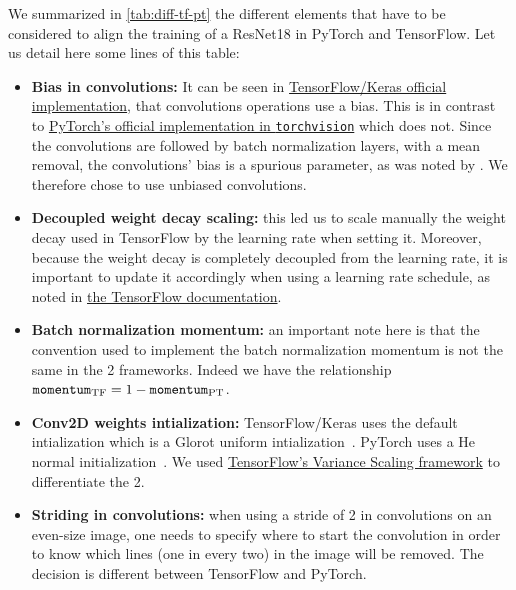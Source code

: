 \documentclass{article}
\begin{document}
We summarized in \autoref{tab:diff-tf-pt} the different elements that have to be considered to align the training of a ResNet18 in PyTorch and TensorFlow.
Let us detail here some lines of this table:
\begin{itemize}[topsep=0pt,itemsep=1ex,partopsep=0ex,parsep=0ex,leftmargin=3ex]
    \item \textbf{Bias in convolutions:} It can be seen in \href{https://github.com/keras-team/keras/blob/master/keras/applications/resnet.py#L238}{TensorFlow/Keras official implementation}, that convolutions operations use a bias. This is in contrast to \href{https://github.com/pytorch/vision/blob/main/torchvision/models/resnet.py#L49}{PyTorch's official implementation in \texttt{torchvision}} which does not.
    Since the convolutions are followed by batch normalization layers, with a mean removal, the convolutions' bias is a spurious parameter, as was noted by \citet{ioffe2015batch}.
    We therefore chose to use unbiased convolutions.
    \item \textbf{Decoupled weight decay scaling:} this led us to scale manually the weight decay used in TensorFlow by the learning rate when setting it.
    Moreover, because the weight decay is completely decoupled from the learning rate, it is important to update it accordingly when using a learning rate schedule, as noted in \href{https://www.tensorflow.org/addons/api_docs/python/tfa/optimizers/extend_with_decoupled_weight_decay}{the TensorFlow documentation}.
    \item \textbf{Batch normalization momentum:} an important note here is that the convention used to implement the batch normalization momentum is not the same in the 2 frameworks.
    Indeed we have the relationship $\text{\texttt{momentum}}_\text{TF} = 1 - \text{\texttt{momentum}}_\text{PT}$.
    \item \textbf{Conv2D weights intialization:} TensorFlow/Keras uses the default intialization which is a Glorot uniform intialization~\citep{glorot2010understanding}.
    PyTorch uses a He normal initialization~\citep{he2015delving}.
    We used \href{https://www.tensorflow.org/api_docs/python/tf/keras/initializers/VarianceScaling}{TensorFlow's Variance Scaling framework} to differentiate the 2.
    \item \textbf{Striding in convolutions:} when using a stride of 2 in convolutions on an even-size image, one needs to specify where to start the convolution in order to know which lines (one in every two) in the image will be removed.
    The decision is different between TensorFlow and PyTorch.

\end{itemize}
\end{document}
